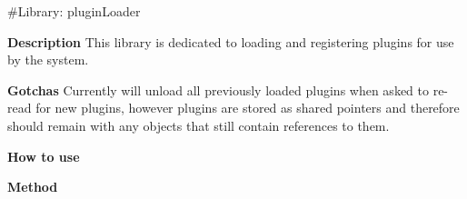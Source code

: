 \#\+Library\+: plugin\+Loader

{\bfseries{Description}} This library is dedicated to loading and registering plugins for use by the system.

{\bfseries{Gotchas}} Currently will unload all previously loaded plugins when asked to re-\/read for new plugins, however plugins are stored as shared pointers and therefore should remain with any objects that still contain references to them.

{\bfseries{How to use}}

{\bfseries{Method}} 